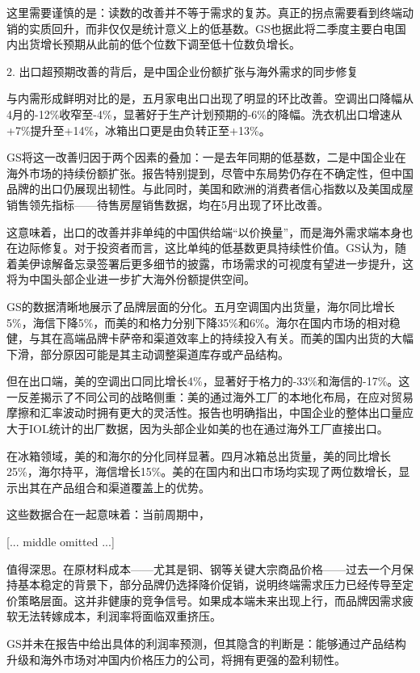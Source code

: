 \documentclass[11pt]{ctexart}
\begin{document}
这里需要谨慎的是：读数的改善并不等于需求的复苏。真正的拐点需要看到终端动销的实质回升，而非仅仅是统计意义上的低基数。GS也据此将二季度主要白电国内出货增长预期从此前的低个位数下调至低十位数负增长。

2. 出口超预期改善的背后，是中国企业份额扩张与海外需求的同步修复

与内需形成鲜明对比的是，五月家电出口出现了明显的环比改善。空调出口降幅从4月的-12\%收窄至-4\%，显著好于生产计划预期的-6\%的降幅。洗衣机出口增速从+7\%提升至+14\%，冰箱出口更是由负转正至+13\%。

GS将这一改善归因于两个因素的叠加：一是去年同期的低基数，二是中国企业在海外市场的持续份额扩张。报告特别提到，尽管中东局势仍存在不确定性，但中国品牌的出口仍展现出韧性。与此同时，美国和欧洲的消费者信心指数以及美国成屋销售领先指标——待售房屋销售数据，均在5月出现了环比改善。

这意味着，出口的改善并非单纯的中国供给端“以价换量”，而是海外需求端本身也在边际修复。对于投资者而言，这比单纯的低基数更具持续性价值。GS认为，随着美伊谅解备忘录签署后更多细节的披露，市场需求的可视度有望进一步提升，这将为中国头部企业进一步扩大海外份额提供空间。

GS的数据清晰地展示了品牌层面的分化。五月空调国内出货量，海尔同比增长5\%，海信下降5\%，而美的和格力分别下降35\%和6\%。海尔在国内市场的相对稳健，与其在高端品牌卡萨帝和渠道效率上的持续投入有关。而美的国内出货的大幅下滑，部分原因可能是其主动调整渠道库存或产品结构。

但在出口端，美的空调出口同比增长4\%，显著好于格力的-33\%和海信的-17\%。这一反差揭示了不同公司的战略侧重：美的通过海外工厂的本地化布局，在应对贸易摩擦和汇率波动时拥有更大的灵活性。报告也明确指出，中国企业的整体出口量应大于IOL统计的出厂数据，因为头部企业如美的也在通过海外工厂直接出口。

在冰箱领域，美的和海尔的分化同样显著。四月冰箱总出货量，美的同比增长25\%，海尔持平，海信增长15\%。美的在国内和出口市场均实现了两位数增长，显示出其在产品组合和渠道覆盖上的优势。

这些数据合在一起意味着：当前周期中，

[... middle omitted ...]

值得深思。在原材料成本——尤其是铜、钢等关键大宗商品价格——过去一个月保持基本稳定的背景下，部分品牌仍选择降价促销，说明终端需求压力已经传导至定价策略层面。这并非健康的竞争信号。如果成本端未来出现上行，而品牌因需求疲软无法转嫁成本，利润率将面临双重挤压。

GS并未在报告中给出具体的利润率预测，但其隐含的判断是：能够通过产品结构升级和海外市场对冲国内价格压力的公司，将拥有更强的盈利韧性。
\end{document}
